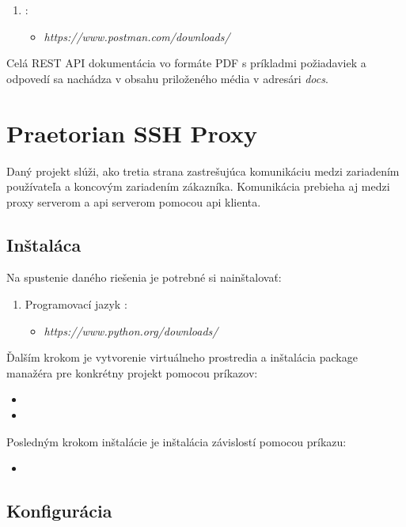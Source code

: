 \begin{enumerate}
\item {}:
\begin{itemize}
\item \emph{https://www.postman.com/downloads/}
\end{itemize}
\end{enumerate}

Celá REST API dokumentácia vo formáte PDF s príkladmi požiadaviek a odpovedí sa nachádza v obsahu priloženého média v
adresári \emph{docs}.

\section{Praetorian SSH Proxy}

Daný projekt slúži, ako tretia strana zastrešujúca komunikáciu medzi zariadením používateľa a koncovým zariadením zákazníka.
Komunikácia prebieha aj medzi proxy serverom a api serverom pomocou api klienta.

\subsection{Inštaláca}

Na spustenie daného riešenia je potrebné si nainštalovať:

\begin{enumerate}
\item Programovací jazyk :
\begin{itemize}
\item \emph{https://www.python.org/downloads/}
\end{itemize}
\end{enumerate}

Ďalším krokom je vytvorenie virtuálneho prostredia a inštalácia package manažéra  pre konkrétny projekt pomocou príkazov:
\begin{itemize}
\item {}
\item {}
\end{itemize}

Posledným krokom inštalácie je inštalácia závislostí pomocou príkazu:
\begin{itemize}
\item {}
\end{itemize}

\subsection{Konfigurácia}

